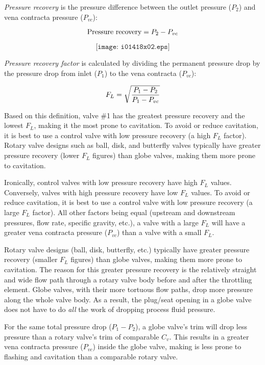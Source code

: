 
{\it Pressure recovery} is the pressure difference between the outlet pressure ($P_2$) and vena contracta pressure ($P_{vc}$):

$$\hbox{Pressure recovery} = P_2 - P_{vc}$$

$$\texttt{[image: i01418x02.eps]}$$

{\it Pressure recovery factor} is calculated by dividing the permanent pressure drop by the pressure drop from inlet ($P_1$) to the vena contracta ($P_{vc}$):

$$F_L = \sqrt{{P_1 - P_2} \over {P_1 - P_{vc}}}$$

Based on this definition, valve \#1 has the greatest pressure recovery and the lowest $F_L$, making it the most prone to cavitation.  To avoid or reduce cavitation, it is best to use a control valve with low pressure recovery (a high $F_{L}$ factor).  Rotary valve designs such as ball, disk, and butterfly valves typically have greater pressure recovery (lower $F_{L}$ figures) than globe valves, making them more prone to cavitation.

\vskip 10pt

Ironically, control valves with low pressure recovery have high $F_L$ values.  Conversely, valves with high pressure recovery have low $F_L$ values.  To avoid or reduce cavitation, it is best to use a control valve with low pressure recovery (a large $F_{L}$ factor).  All other factors being equal (upstream and downstream pressures, flow rate, specific gravity, etc.), a valve with a large $F_{L}$ will have a greater vena contracta pressure ($P_{vc}$) than a valve with a small $F_{L}$.

\vskip 10pt

Rotary valve designs (ball, disk, butterfly, etc.) typically have greater pressure recovery (smaller $F_{L}$ figures) than globe valves, making them more prone to cavitation.  The reason for this greater pressure recovery is the relatively straight and wide flow path through a rotary valve body before and after the throttling element.  Globe valves, with their more tortuous flow paths, drop more pressure along the whole valve body.  As a result, the plug/seat opening in a globe valve does not have to do {\it all} the work of dropping process fluid pressure.

For the same total pressure drop ($P_1 - P_2$), a globe valve's trim will drop less pressure than a rotary valve's trim of comparable $C_{v}$.  This results in a greater vena contracta pressure ($P_{vc}$) inside the globe valve, making is less prone to flashing and cavitation than a comparable rotary valve.

